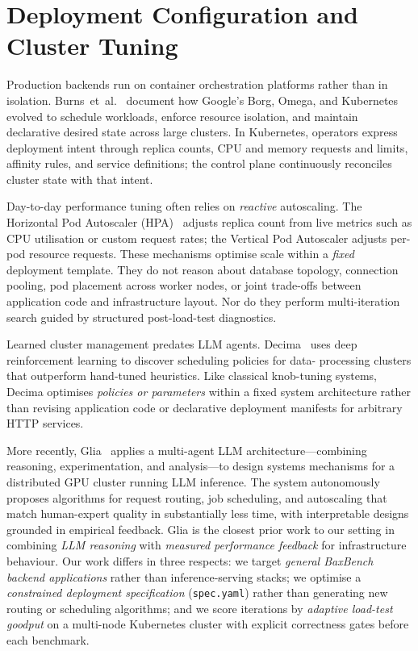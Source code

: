 \section{Deployment Configuration and Cluster Tuning}
\label{sec:rw-cluster}

Production backends run on container orchestration platforms rather than in
isolation.  Burns~et~al.~\cite{burns2016borg} document how Google's Borg,
Omega, and Kubernetes evolved to schedule workloads, enforce resource isolation,
and maintain declarative desired state across large clusters.  In Kubernetes,
operators express deployment intent through replica counts, CPU and memory
requests and limits, affinity rules, and service definitions; the control plane
continuously reconciles cluster state with that intent.

Day-to-day performance tuning often relies on \emph{reactive} autoscaling.
The Horizontal Pod Autoscaler (HPA)~\cite{kubernetes-hpa} adjusts replica
count from live metrics such as CPU utilisation or custom request rates; the
Vertical Pod Autoscaler adjusts per-pod resource requests.  These mechanisms
optimise scale within a \emph{fixed} deployment template.  They do not reason
about database topology, connection pooling, pod placement across worker nodes,
or joint trade-offs between application code and infrastructure layout.  Nor do
they perform multi-iteration search guided by structured post-load-test
diagnostics.

Learned cluster management predates LLM agents.  Decima~\cite{mao2019decima}
uses deep reinforcement learning to discover scheduling policies for data-
processing clusters that outperform hand-tuned heuristics.  Like classical
knob-tuning systems, Decima optimises \emph{policies or parameters} within a
fixed system architecture rather than revising application code or declarative
deployment manifests for arbitrary HTTP services.

More recently, Glia~\cite{hamadanian2025glia} applies a multi-agent LLM
architecture---combining reasoning, experimentation, and analysis---to design
systems mechanisms for a distributed GPU cluster running LLM inference.  The
system autonomously proposes algorithms for request routing, job scheduling,
and autoscaling that match human-expert quality in substantially less time, with
interpretable designs grounded in empirical feedback.  Glia is the closest prior
work to our setting in combining \emph{LLM reasoning} with \emph{measured
performance feedback} for infrastructure behaviour.  Our work differs in three
respects: we target \emph{general BaxBench backend applications} rather than
inference-serving stacks; we optimise a \emph{constrained deployment
specification} (\texttt{spec.yaml}) rather than generating new routing or
scheduling algorithms; and we score iterations by \emph{adaptive load-test
goodput} on a multi-node Kubernetes cluster with explicit correctness gates
before each benchmark.

